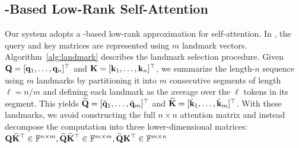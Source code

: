 \documentclass[sigconf,anonymous,review,balance=false]{acmart}
\begin{document}

\subsection{\nystrom-Based Low-Rank Self-Attention}\label{subsec:nystrom-attention}
Our system adopts a \nystrom-based low-rank approximation for self-attention. In \nystromformer, the query and key matrices are represented using $m$ landmark vectors.
Algorithm~\ref{alg:landmark} describes the landmark selection procedure. Given ${\mathbf{Q}}=[\mathbf{q}_1,\ldots,\mathbf{q}_n]^\top$ and ${\mathbf{K}}=[\mathbf{k}_1,\ldots,\mathbf{k}_n]^\top$, we summarize the length-$n$ sequence using $m$ landmarks by partitioning it into $m$ consecutive segments of length $\ell = n/m$ and defining each landmark as the average over the $\ell$ tokens in its segment. This yields $\widetilde{{\mathbf{Q}}}=[\tilde{\mathbf{q}}_1,\ldots,\tilde{\mathbf{q}}_m]^\top$ and $\widetilde{{\mathbf{K}}}=[\tilde{\mathbf{k}}_1,\ldots,\tilde{\mathbf{k}}_m]^\top$.
With these landmarks, we avoid constructing the full $n\times n$ attention matrix and instead decompose the computation into three lower-dimensional matrices: ${\mathbf{Q}}\widetilde{{\mathbf{K}}}^{\top} \in \mathbb{F}^{n \times m}, \widetilde{{\mathbf{Q}}}\widetilde{{\mathbf{K}}}^{\top} \in \mathbb{F}^{m \times m}, \widetilde{{\mathbf{Q}}}{\mathbf{K}}^{\top} \in \mathbb{F}^{m \times n}$
\end{document}
